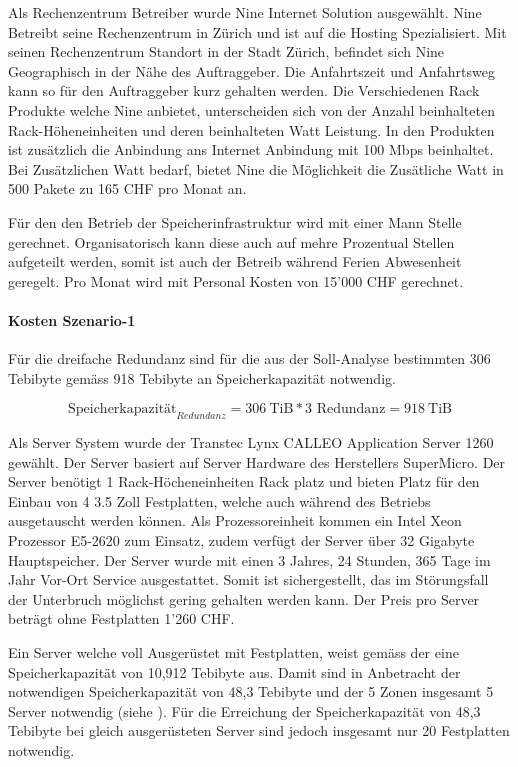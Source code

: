 Als Rechenzentrum Betreiber wurde Nine Internet Solution ausgewählt. Nine Betreibt seine Rechenzentrum in Zürich und ist auf die Hosting Spezialisiert. Mit seinen Rechenzentrum Standort in der Stadt Zürich, befindet sich Nine Geographisch in der Nähe des Auftraggeber. Die Anfahrtszeit und Anfahrtsweg kann so für den Auftraggeber kurz gehalten werden. Die Verschiedenen Rack Produkte welche Nine anbietet, unterscheiden sich von der Anzahl beinhalteten Rack-Höheneinheiten und deren beinhalteten Watt Leistung. In den Produkten ist zusätzlich die Anbindung ans Internet Anbindung mit 100 Mbps beinhaltet. Bei Zusätzlichen Watt bedarf, bietet Nine die Möglichkeit die Zusätliche Watt in 500 Pakete zu 165 CHF pro Monat an.

Für den den Betrieb der Speicherinfrastruktur wird mit einer Mann Stelle gerechnet. Organisatorisch kann diese auch auf mehre Prozentual Stellen aufgeteilt werden, somit ist auch der Betreib während Ferien Abwesenheit geregelt. Pro Monat wird mit Personal Kosten von 15'000 CHF gerechnet.


\paragraph*{Kosten Szenario-1}

Für die dreifache Redundanz sind für die aus der Soll-Analyse bestimmten 306 Tebibyte gemäss  918 Tebibyte an Speicherkapazität notwendig.

\begin{equation}
\mbox{Speicherkapazität}_{Redundanz} = 306 \mathrm{\ TiB} * 3 \mbox{\ Redundanz} = 918 \mathrm{\ TiB}
\label{eqn:SpeicherkapazitätS1}
\end{equation}


Als Server System wurde der Transtec Lynx CALLEO Application Server 1260 gewählt. Der Server basiert auf Server Hardware des Herstellers SuperMicro. Der Server benötigt 1 Rack-Höcheneinheiten Rack platz und bieten Platz für den Einbau von 4 3.5 Zoll Festplatten, welche auch während des Betriebs ausgetauscht werden können. Als Prozessoreinheit kommen ein Intel Xeon Prozessor E5-2620 zum Einsatz, zudem verfügt der Server über 32 Gigabyte Hauptspeicher. Der Server wurde mit einen 3 Jahres, 24 Stunden, 365 Tage im Jahr Vor-Ort Service ausgestattet. Somit ist sichergestellt, das im Störungsfall der Unterbruch möglichst gering gehalten werden kann. Der Preis pro Server beträgt ohne Festplatten 1'260 CHF.


Ein Server welche voll Ausgerüstet mit Festplatten, weist gemäss der  eine Speicherkapazität von 10,912 Tebibyte aus. Damit sind in Anbetracht der notwendigen Speicherkapazität von 48,3 Tebibyte und der 5 Zonen insgesamt 5 Server notwendig (siehe ). Für die Erreichung der Speicherkapazität von 48,3 Tebibyte bei gleich ausgerüsteten Server sind jedoch insgesamt nur 20 Festplatten notwendig.

